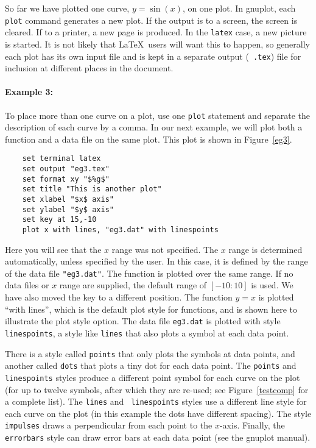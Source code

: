 So far we have plotted one curve, $y=\sin(x)$, on one plot. In
gnuplot, each {\tt plot} command generates a new plot. If the output
is to a screen, the screen is cleared. If to a printer, a new page is
produced. In the {\tt latex} case, a new picture is started. It is not
likely that \LaTeX\ users will want this to happen, so generally each
plot has its own input file and is kept in a separate output ({\tt
.tex}) file for inclusion at different places in the document.

\paragraph{Example 3:} To place more than one curve on a plot, use one
{\tt plot} statement and separate the description of each curve by a
comma. In our next example, we will plot both a function and a data
file on the same plot. This plot is shown in Figure~\ref{eg3}.

\singlespace
\begin{verbatim}
    set terminal latex
    set output "eg3.tex"
    set format xy "$%g$"
    set title "This is another plot"
    set xlabel "$x$ axis"
    set ylabel "$y$ axis"
    set key at 15,-10
    plot x with lines, "eg3.dat" with linespoints
\end{verbatim}
\currentspace


Here you will see that the $x$ range was not specified. The $x$ range
is determined automatically, unless specified by the user.  In
this case, it is defined by the range of the data file
\verb+"eg3.dat"+. The function is plotted over the same range. If no
data files or $x$ range are supplied, the default range of $[-10:10]$
is used. We have also moved the key to a different position.  The
function $y=x$ is plotted ``with lines'', which is the default plot
style for functions, and is shown here to illustrate the plot style
option.  The data file {\tt eg3.dat} is plotted with style {\tt
linespoints}, a style like {\tt lines} that also plots a symbol at
each data point.

There is a style called {\tt points} that only plots the symbols at
data points, and another called {\tt dots} that plots a tiny dot for
each data point.  The {\tt points} and {\tt linespoints} styles
produce a different point symbol for each curve on the plot (for up to
twelve symbols, after which they are re-used; see
Figure~\ref{testcomp} for a complete list). The {\tt lines} and {\tt
linespoints} styles use a different line style for each curve on the
plot (in this example the dots have different spacing). The
style {\tt impulses} draws a perpendicular from each point to the
$x$-axis. Finally, the {\tt errorbars} style can draw error bars at
each data point (see the gnuplot manual).

